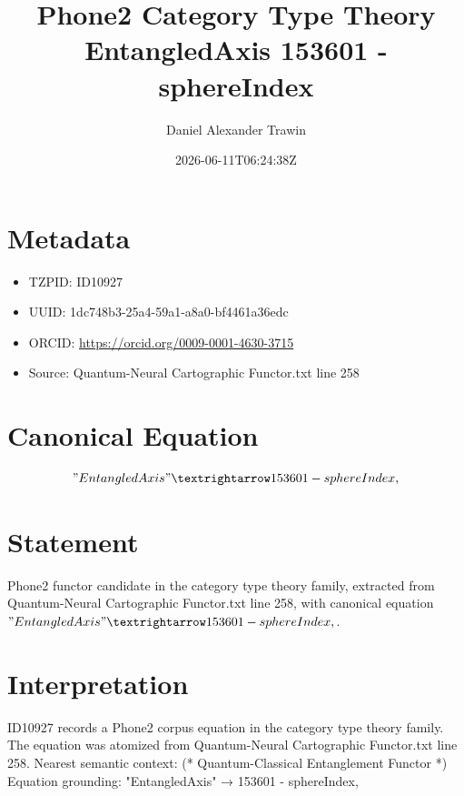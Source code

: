 \documentclass[11pt]{article}
\title{Phone2 Category Type Theory EntangledAxis 153601 - sphereIndex}
\author{Daniel Alexander Trawin}
\date{2026-06-11T06:24:38Z}
\begin{document}
\maketitle
\section*{Metadata}
\begin{itemize}
\item TZPID: ID10927
\item UUID: 1dc748b3-25a4-59a1-a8a0-bf4461a36edc
\item ORCID: \url{https://orcid.org/0009-0001-4630-3715}
\item Source: Quantum-Neural Cartographic Functor.txt line 258
\end{itemize}
\section*{Canonical Equation}
\[
"EntangledAxis" → 153601 - sphereIndex,
\]
\section*{Statement}
Phone2 functor candidate in the category type theory family, extracted from Quantum-Neural Cartographic Functor.txt line 258, with canonical equation $"EntangledAxis" → 153601 - sphereIndex,$.
\section*{Interpretation}
ID10927 records a Phone2 corpus equation in the category type theory family. The equation was atomized from Quantum-Neural Cartographic Functor.txt line 258. Nearest semantic context: (* Quantum-Classical Entanglement Functor *) Equation grounding: "EntangledAxis" → 153601 - sphereIndex,
\end{document}
